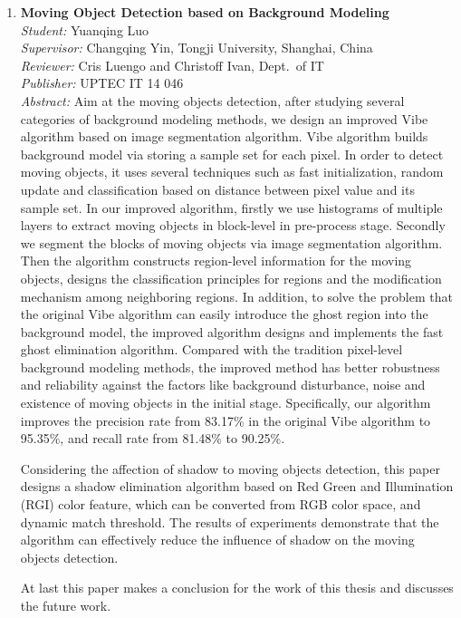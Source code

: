 \begin{small}
\begin{enumerate}
\item\textbf{Moving Object Detection based on Background Modeling}\\
  \emph{Student:} Yuanqing  Luo\\
  \emph{Supervisor:} Changqing Yin, Tongji University, Shanghai, China \\
  \emph{Reviewer:} Cris Luengo and Christoff Ivan, Dept.~of IT\\
  \emph{Publisher:} UPTEC IT 14 046 \\
  \emph{Abstract:} Aim at the moving objects detection, after studying several categories of background modeling methods, we design an improved Vibe algorithm based on image segmentation algorithm. Vibe algorithm builds background model via storing a sample set for each pixel. In order to detect moving objects, it uses several techniques such as fast initialization, random update and classification based on distance between pixel value and its sample set. In our improved algorithm, firstly we use histograms of multiple layers to extract moving objects in block-level in pre-process stage. Secondly we segment the blocks of moving objects via image segmentation algorithm. Then the algorithm constructs region-level information for the moving objects, designs the classification principles for regions and the modification mechanism among neighboring regions. In addition, to solve the problem that the original Vibe algorithm can easily introduce the ghost region into the background model, the improved algorithm designs and implements the fast ghost elimination algorithm. Compared with the tradition pixel-level background modeling methods, the improved method has better  robustness and reliability against the factors like background disturbance, noise and existence of moving objects in the initial stage. Specifically, our algorithm improves the precision rate from 83.17\% in the original Vibe algorithm to 95.35\%, and recall rate from 81.48\% to 90.25\%.

Considering the affection of shadow to moving objects detection, this paper designs a shadow elimination algorithm based on Red Green and Illumination (RGI) color feature, which can be converted from RGB color space, and dynamic match threshold. The results of experiments demonstrate  that the algorithm can effectively reduce the influence of shadow on the moving objects detection.

At last this paper makes a conclusion for the work of this thesis and discusses the future work.


\end{enumerate}
\end{small}
